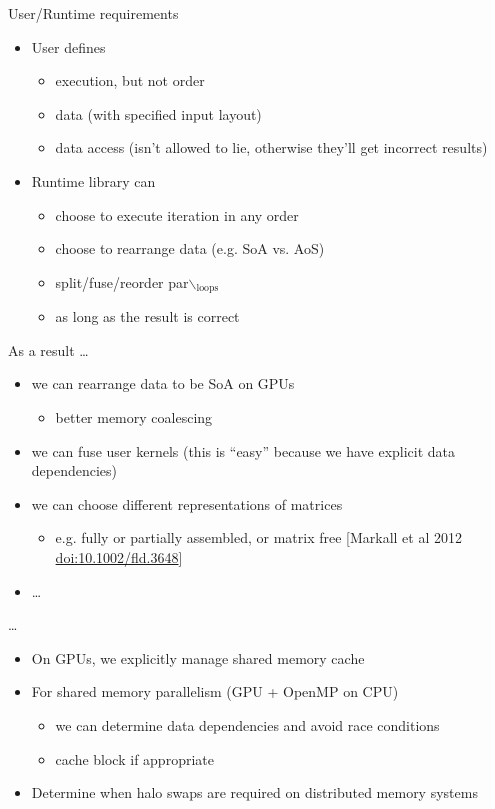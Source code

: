 \documentclass[presentation]{beamer}
\begin{document}
\begin{frame}[label={sec:orgheadline14}]{User/Runtime requirements}
\begin{itemize}
\item User defines
\begin{itemize}
\item execution, but not order
\item data (with specified input layout)
\item data access (isn't allowed to lie, otherwise they'll get
incorrect results)
\end{itemize}

\item Runtime library can
\begin{itemize}
\item choose to execute iteration in any order
\item choose to rearrange data (e.g. SoA vs. AoS)
\item split/fuse/reorder par$\backslash$\(_{\text{loops}}\)
\item as long as the result is correct
\end{itemize}
\end{itemize}
\end{frame}

\begin{frame}[label={sec:orgheadline15}]{As a result \ldots{}}
\begin{itemize}
\item we can rearrange data to be SoA on GPUs
\begin{itemize}
\item better memory coalescing
\end{itemize}
\item we can fuse user kernels (this is ``easy'' because we have explicit
data dependencies)
\item we can choose different representations of matrices
\begin{itemize}
\item e.g. fully or partially assembled, or matrix free [Markall
et al 2012 \url{doi:10.1002/fld.3648}]
\end{itemize}
\item \ldots{}
\end{itemize}
\end{frame}

\begin{frame}[label={sec:orgheadline16}]{\ldots{}}
\begin{itemize}
\item On GPUs, we explicitly manage shared memory cache
\item For shared memory parallelism (GPU + OpenMP on CPU)
\begin{itemize}
\item we can determine data dependencies and avoid race conditions
\item cache block if appropriate
\end{itemize}
\item Determine when halo swaps are required on distributed memory
systems
\end{itemize}
\end{frame}
\end{document}
